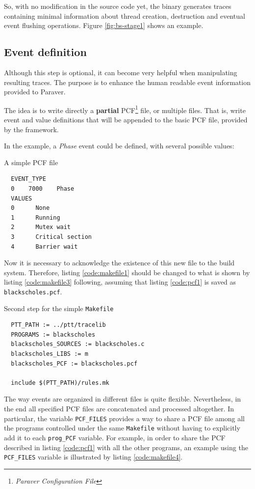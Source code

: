 So, with no modification in the source code yet, the binary generates traces
containing minimal information about thread creation, destruction and eventual
event flushing operations.  Figure \ref{fig:bs-stage1} shows an example.


\subsection{Event definition}
\label{sec:pcf_sample}

Although this step is optional, it can become very helpful when manipulating
resulting traces.  The purpose is to enhance the human readable event
information provided to Paraver.

The idea is to write directly a \textbf{partial} PCF\footnote{\emph{Paraver
Configuration File}} file, or multiple files.  That is, write event and value
definitions that will be appended to the basic PCF file, provided by the
framework.

In the example, a \emph{Phase} event could be defined, with several possible
values:

\begin{listing}
\label{code:pcf1}
\caption{A simple PCF file}
\begin{verbatim}
  EVENT_TYPE
  0    7000    Phase
  VALUES
  0      None
  1      Running
  2      Mutex wait
  3      Critical section
  4      Barrier wait
\end{verbatim}
\end{listing}

Now it is necessary to acknowledge the existence of this new file to the build
system.  Therefore, listing \ref{code:makefile1} should be changed to what is
shown by listing \ref{code:makefile3} following, assuming that listing
\ref{code:pcf1} is saved as \verb:blackscholes.pcf:.

\begin{listing}
\label{code:makefile3}
\caption{Second step for the simple \texttt{Makefile}}
\begin{verbatim}
  PTT_PATH := ../ptt/tracelib
  PROGRAMS := blackscholes
  blackscholes_SOURCES := blackscholes.c
  blackscholes_LIBS := m
  blackscholes_PCF := blackscholes.pcf

  include $(PTT_PATH)/rules.mk
\end{verbatim}
\end{listing}

The way events are organized in different files is quite flexible.
Nevertheless, in the end all specified PCF files are concatenated and processed
altogether.  In particular, the variable \verb:PCF_FILES: provides a way to
share a PCF file among all the programs controlled under the same
\verb:Makefile: without having to explicitly add it to each \verb:prog_PCF:
variable.  For example, in order to share the PCF described in listing
\ref{code:pcf1} with all the other programs, an example using the
\verb:PCF_FILES: variable is illustrated by listing \ref{code:makefile4}.


